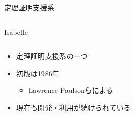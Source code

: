 \documentclass[17pt,aspectratio=169]{beamer}
\begin{document}
\begin{frame}{定理証明支援系}
\begin{columns}
\begin{column}{0.35\textwidth}
        \end{column}
    \end{columns}


\end{frame}


\begin{frame}{Isabelle}
    \begin{columns}
        \begin{column}{0.75\textwidth}
            \begin{itemize}
                \item 定理証明支援系の一つ
                \item 初版は1986年
                      {\small \begin{itemize}
                          \item Lawrence Paulsonらによる
                      \end{itemize} }
                \item 現在も開発・利用が続けられている
            \end{itemize}


\end{column}
\end{columns}
\end{frame}
\end{document}
